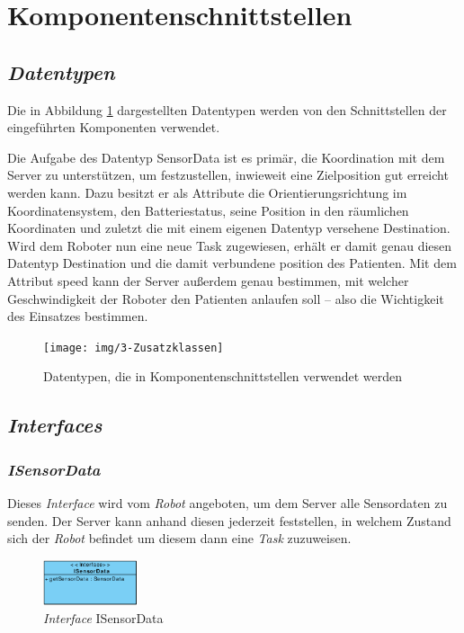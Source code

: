 \section{Komponentenschnittstellen}

\subsection{\textit{Datentypen}}
Die in Abbildung \ref{KomponentenschnittstellenDiagramm} dargestellten Datentypen werden von den Schnittstellen der eingeführten Komponenten verwendet. 

Die Aufgabe des Datentyp SensorData ist es primär, die Koordination mit dem Server zu unterstützen, um festzustellen, inwieweit eine Zielposition gut erreicht werden kann. Dazu besitzt er als Attribute die Orientierungsrichtung im Koordinatensystem, den Batteriestatus, seine Position in den räumlichen Koordinaten und zuletzt die mit einem eigenen Datentyp versehene Destination. Wird dem Roboter nun eine neue Task zugewiesen, erhält er damit genau diesen Datentyp Destination und die damit verbundene position des Patienten. Mit dem Attribut speed kann der Server außerdem genau bestimmen, mit welcher Geschwindigkeit der Roboter den Patienten anlaufen soll – also die Wichtigkeit des Einsatzes bestimmen.

	
	\begin{figure}[H]
		\centering
		\texttt{[image: img/3-Zusatzklassen]}
		\caption{Datentypen, die in Komponentenschnittstellen verwendet werden}
		\label{KomponentenschnittstellenDiagramm}
	\end{figure}
	\pagebreak

\subsection{\textit{Interfaces}}
	\subsubsection{\textit{ISensorData}}
	Dieses \textit{Interface} wird vom \textit{Robot} angeboten, um dem Server alle Sensordaten zu senden. Der Server kann anhand diesen jederzeit feststellen, in welchem Zustand sich der \textit{Robot} befindet um diesem dann eine \textit{Task} zuzuweisen.
	\begin{figure}[H]
	\centering
	\includegraphics[width=0.25\textwidth]{img/1-Entwurf-3-1_ISensorData}
	\caption{\textit{Interface} ISensorData}
	\label{ISensorData}
	\end{figure}
	
